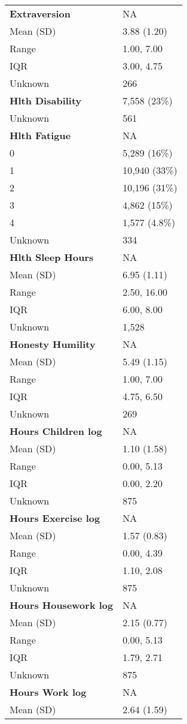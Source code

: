 \documentclass[
  single column]{article}
\begin{document}
\begin{longtable}[]{@{}ll@{}}
\textbf{Extraversion} & NA \\
Mean (SD) & 3.88 (1.20) \\
Range & 1.00, 7.00 \\
IQR & 3.00, 4.75 \\
Unknown & 266 \\
\textbf{Hlth Disability} & 7,558 (23\%) \\
Unknown & 561 \\
\textbf{Hlth Fatigue} & NA \\
0 & 5,289 (16\%) \\
1 & 10,940 (33\%) \\
2 & 10,196 (31\%) \\
3 & 4,862 (15\%) \\
4 & 1,577 (4.8\%) \\
Unknown & 334 \\
\textbf{Hlth Sleep Hours} & NA \\
Mean (SD) & 6.95 (1.11) \\
Range & 2.50, 16.00 \\
IQR & 6.00, 8.00 \\
Unknown & 1,528 \\
\textbf{Honesty Humility} & NA \\
Mean (SD) & 5.49 (1.15) \\
Range & 1.00, 7.00 \\
IQR & 4.75, 6.50 \\
Unknown & 269 \\
\textbf{Hours Children log} & NA \\
Mean (SD) & 1.10 (1.58) \\
Range & 0.00, 5.13 \\
IQR & 0.00, 2.20 \\
Unknown & 875 \\
\textbf{Hours Exercise log} & NA \\
Mean (SD) & 1.57 (0.83) \\
Range & 0.00, 4.39 \\
IQR & 1.10, 2.08 \\
Unknown & 875 \\
\textbf{Hours Housework log} & NA \\
Mean (SD) & 2.15 (0.77) \\
Range & 0.00, 5.13 \\
IQR & 1.79, 2.71 \\
Unknown & 875 \\
\textbf{Hours Work log} & NA \\
Mean (SD) & 2.64 (1.59) \\

\end{longtable}
\end{document}
